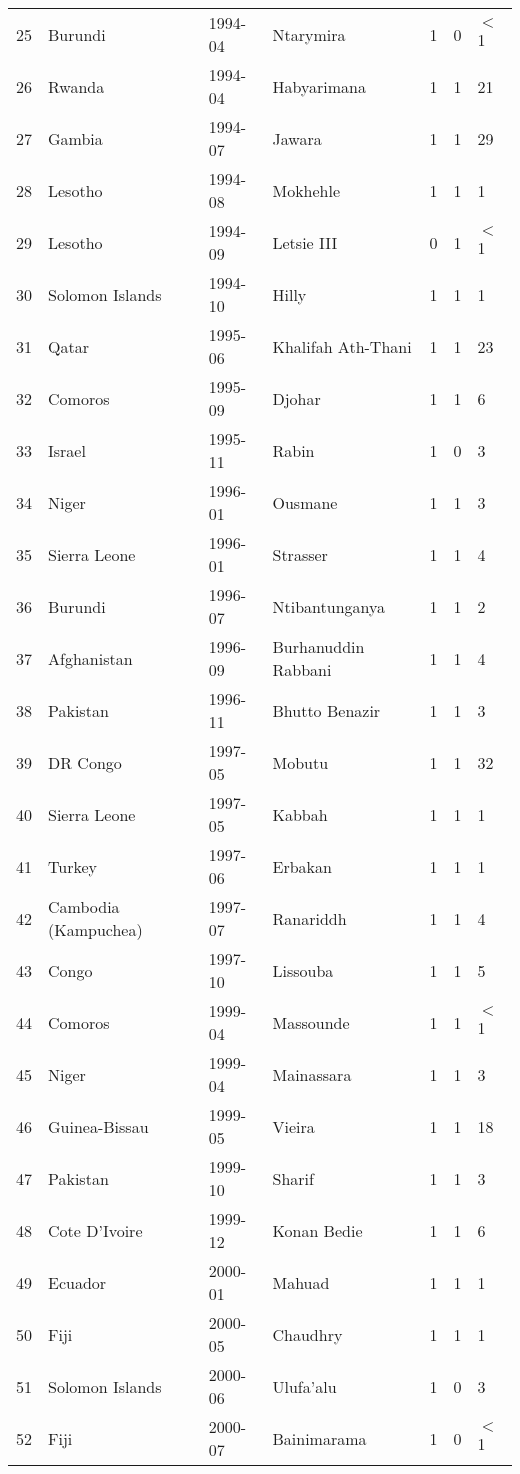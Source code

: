 \begin{table}[ht]
\begin{tabular}{rlllrrl}
  25 & Burundi & 1994-04 & Ntarymira & 1 & 0 & $<$1 \\ 
  26 & Rwanda & 1994-04 & Habyarimana & 1 & 1 & 21 \\ 
  27 & Gambia & 1994-07 & Jawara & 1 & 1 & 29 \\ 
  28 & Lesotho & 1994-08 & Mokhehle & 1 & 1 & 1 \\ 
  29 & Lesotho & 1994-09 & Letsie III & 0 & 1 & $<$1 \\ 
  30 & Solomon Islands & 1994-10 & Hilly & 1 & 1 & 1 \\ 
  31 & Qatar & 1995-06 & Khalifah Ath-Thani & 1 & 1 & 23 \\ 
  32 & Comoros & 1995-09 & Djohar & 1 & 1 & 6 \\ 
  33 & Israel & 1995-11 & Rabin & 1 & 0 & 3 \\ 
  34 & Niger & 1996-01 & Ousmane & 1 & 1 & 3 \\ 
  35 & Sierra Leone & 1996-01 & Strasser & 1 & 1 & 4 \\ 
  36 & Burundi & 1996-07 & Ntibantunganya & 1 & 1 & 2 \\ 
  37 & Afghanistan & 1996-09 & Burhanuddin Rabbani & 1 & 1 & 4 \\ 
  38 & Pakistan & 1996-11 & Bhutto Benazir & 1 & 1 & 3 \\ 
  39 & DR Congo & 1997-05 & Mobutu & 1 & 1 & 32 \\ 
  40 & Sierra Leone & 1997-05 & Kabbah & 1 & 1 & 1 \\ 
  41 & Turkey & 1997-06 & Erbakan & 1 & 1 & 1 \\ 
  42 & Cambodia (Kampuchea) & 1997-07 & Ranariddh & 1 & 1 & 4 \\ 
  43 & Congo & 1997-10 & Lissouba & 1 & 1 & 5 \\ 
  44 & Comoros & 1999-04 & Massounde & 1 & 1 & $<$1 \\ 
  45 & Niger & 1999-04 & Mainassara & 1 & 1 & 3 \\ 
  46 & Guinea-Bissau & 1999-05 & Vieira & 1 & 1 & 18 \\ 
  47 & Pakistan & 1999-10 & Sharif & 1 & 1 & 3 \\ 
  48 & Cote D'Ivoire & 1999-12 & Konan Bedie & 1 & 1 & 6 \\ 
  49 & Ecuador & 2000-01 & Mahuad & 1 & 1 & 1 \\ 
  50 & Fiji & 2000-05 & Chaudhry & 1 & 1 & 1 \\ 
  51 & Solomon Islands & 2000-06 & Ulufa'alu & 1 & 0 & 3 \\ 
  52 & Fiji & 2000-07 & Bainimarama & 1 & 0 & $<$1 \\ 

\end{tabular}
\end{table}
